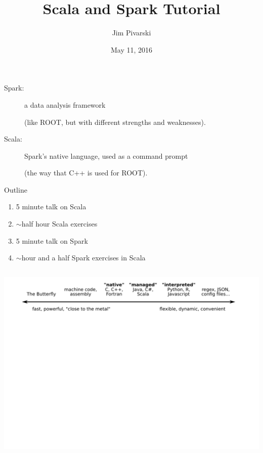 \documentclass{beamer}
\title[2016-05-11-scala-spark]{Scala and Spark Tutorial}
\author{Jim Pivarski}
\institute{Princeton University -- DIANA}
\date{May 11, 2016}
\begin{document}
\begin{frame}
  \titlepage
\end{frame}


\begin{frame}{}
\begin{description}
\item[Spark:] a data analysis framework

(like ROOT, but with different strengths and weaknesses).

\vspace{0.5 cm}

\item[Scala:] Spark's native language, used as a command prompt

(the way that C++ is used for ROOT).
\end{description}
\end{frame}

\begin{frame}{Outline}
\begin{enumerate}
\item 5 minute talk on Scala
\item $\sim$half hour Scala exercises
\item 5 minute talk on Spark
\item $\sim$hour and a half Spark exercises in Scala
\end{enumerate}
\end{frame}

\begin{frame}{}
\begin{columns}
\includegraphics[width=\linewidth]{languages1.pdf}
\end{columns}
\end{frame}
\end{document}
